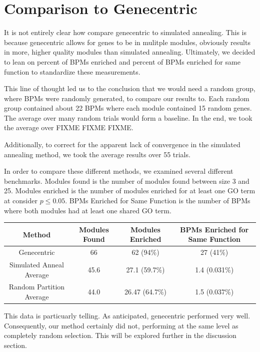 \documentclass[11pt]{article}
\begin{document}
\section{Comparison to Genecentric}

\par It is not entirely clear how compare genecentric to simulated annealing. This is because genecentric allows for genes to be in mulitple modules, obviously results in more, higher quality modules than simulated annealing. Ultimately, we decided to lean on percent of BPMs enriched and percent of BPMs enriched for same function to standardize these measurements. 

\par This line of thought led us to the conclusion that we would need a random group, where BPMs were randomly generated, to compare our results to. Each random group contained about 22 BPMs where each module contained 15 random genes. The average over many random trials would form a baseline. In the end, we took the average over FIXME FIXME FIXME.

\par Additionally, to correct for the apparent lack of convergence in the simulated annealing method, we took the average results over 55 trials.

\par In order to compare these different methods, we examined several different benchmarks. Modules found is the number of modules found between size 3 and 25. Modules enriched is the number of modules enriched for at least one GO term at consider  $p \leq 0.05 $. BPMs Enriched for Same Function is the number of BPMs where both modules had at least one shared GO term.
\begin{center}
\begin{tabular}{ |c | c |c| c | } 
 \hline
 Method & Modules Found & Modules Enriched & BPMs Enriched for Same Function \\
	\hline
 Genecentric              & 66 & 62 (94\%) & 27 (41\%)\\ 
	\hline 
 Simulated Anneal Average & 45.6 & 27.1 (59.7\%) & 1.4 (0.031\%)\\ 
 \hline
 Random Partition Average & 44.0 & 26.47 (64.7\%) & 1.5 (0.037\%)\\ 
 \hline
\end{tabular}
\end{center}
\par This data is particuarly telling. As anticipated, genecentric performed very well. Consequently, our method certainly did not, performing at the same level as completely random selection. This will be explored further in the discussion section.
\end{document}
